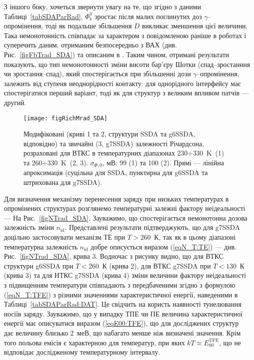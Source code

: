 З іншого боку, хочеться звернути увагу на те, що згідно з даними Таблиці~\ref{tabSDAParRad},
$\Phi_b^0$ зростає після малих поглинутих доз $\gamma$--опромінення, тоді як подальше збільшення $D$ викликає зменшення
цієї величини.
Така немонотонність співпадає за характером з повідомленою раніше в роботах \cite{Karatas:2006NIMA, Vorobets, Pattabi} і суперечить
даним, отриманим безпосередньо з ВАХ (див. Рис.~\ref{figFbTrad_SDA})  та описаним в \cite{Umana,Verma}.
Таким чином, отримані результати показують, що тип немонотонності зміни висоти бар'єру Шотки (спад--зростанння чи зростання--спад), який спостерігається
при збільшенні дози $\gamma$--опромінення,
залежить від ступеня неоднорідності контакту:
для однорідного інтерфейсу має спостерігатися перший варіант,
тоді як для структур з великим впливом патчів --- другий.


\begin{figure}
\center
\texttt{[image: figRichMrad\_SDA]}
\caption{\label{figRichMrad_SDA}
Модифіковані (криві 1 та 2, структури SSDA та g6SSDA, відповідно) та звичайні (3, g7SSDA) залежності Річардсона, розраховані для ВТКС в
температурних діапазонах 230$\div$330~K~(1) та 260$\div$330~K~(2, 3).
$\sigma_{\Phi,0}$, мВ: 99 (1) та 100 (2).
Прямі  --- лінійна апроксимація (суцільна для SSDA, пунктирна для g6SSDA та
штрихована для g7SSDA).
}%
\end{figure}

Для визначення механізму перенесення заряду при низьких температурах
в опромінених структурах розглянемо температурні залежні фактору неідеальності --- На Рис.~\ref{figNTrad_SDA}.
Зауважимо, що спостерігається немонотонна дозова залежність зміни $n_\mathrm{id}$.
Представлені результати підтверджують, що для g7SSDA доцільно застосовувати механізм ТЕ при $T>260$~К,
так як в цьому діапазоні температурна залежність $n_\mathrm{id}$ добре описується виразом (\ref{eqN_T:TE})  --- див. Рис.~\ref{figNTrad_SDA}, крива 3.
Водночас з рисунку видно, що для ВТКС структури g6SSDA при $T<260$~К (крива 2), для ВТКС g7SSDA при $T<130$~К (крива 3) та для НТКС g7SSDA (крива 4)
зміни величини фактору неідеальності з підвищенням температури співпадають з передбаченими згідно з формулою (\ref{eqN_T:TFE}) з різними значеннями характеристичної
енергії, наведеними в Таблиці~\ref{tabSDAParRad:DAT}.
Це свідчить на користь наявності тунелювання носіїв заряду.
Зауважимо, що у випадку ТПЕ чи ПЕ величина характеристичної енергії має описуватися
виразом (\ref{eqE00:TFE}),
що для досліджених структур дає величину близько 2~меВ, що набагато менше ніж визначені значення.
Крім того польова емісія є характерною для температур, при яких $kT\approx E_{00}^\mathrm{TFE}$, що не відповідає дослідженому температурному
інтервалу.


